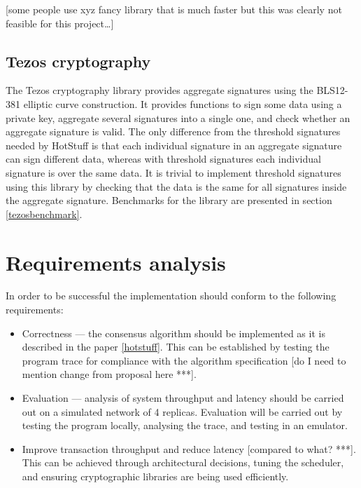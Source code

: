 [some people use xyz fancy library that is much faster but this was clearly not feasible for this project\dots]

\subsection{Tezos cryptography} \label{tezos}
The Tezos cryptography library provides aggregate signatures using the BLS12-381 elliptic curve construction. It provides functions to sign some data using a private key, aggregate several signatures into a single one, and check whether an aggregate signature is valid. The only difference from the threshold signatures needed by HotStuff is that each individual signature in an aggregate signature can sign different data, whereas with threshold signatures each individual signature is over the same data. It is trivial to implement threshold signatures using this library by checking that the data is the same for all signatures inside the aggregate signature. Benchmarks for the library are presented in section \ref{tezosbenchmark}.

\section{Requirements analysis} \label{requirements}

In order to be successful the implementation should conform to the following requirements:

\begin{itemize}
	\item Correctness --- the consensus algorithm should be implemented as it is described in the paper \ref{hotstuff}. This can be established by testing the program trace for compliance with the algorithm specification [do I need to mention change from proposal here ***].
	\item Evaluation --- analysis of system throughput and latency should be carried out on a simulated network of 4 replicas. Evaluation will be carried out by testing the program locally, analysing the trace, and testing in an emulator.
	\item Improve transaction throughput and reduce latency [compared to what? ***]. This can be achieved through architectural decisions, tuning the scheduler, and ensuring cryptographic libraries are being used efficiently.
\end{itemize}

